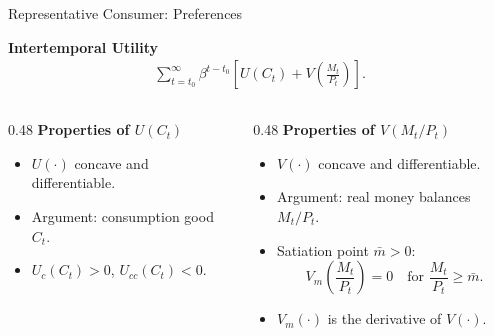 \documentclass[11pt,aspectratio=169]{beamer}
\begin{document}
\begin{frame}{Representative Consumer: Preferences}
\small

\textbf{Intertemporal Utility}
\begin{align}
\sum_{t=t_0}^\infty 
\beta^{t-t_0}
\left[
    U(C_t)
    +
    V\!\left(\frac{M_t}{P_t}\right)
\right].
\label{2.1}
\end{align}

\vspace{0.8em}

\begin{columns}[T,totalwidth=\textwidth]

\begin{column}{0.48\textwidth}
\textbf{Properties of $U(C_t)$}
\begin{itemize}
    \item $U(\cdot)$ concave and differentiable.
    \item Argument: consumption good $C_t$.
    \item $U_c(C_t) > 0$,
          \quad $U_{cc}(C_t) < 0$.
\end{itemize}
\end{column}

\begin{column}{0.48\textwidth}
\textbf{Properties of $V(M_t/P_t)$}
\begin{itemize}
    \item $V(\cdot)$ concave and differentiable.
    \item Argument: real money balances $M_t/P_t$.
    \item Satiation point $\bar{m} > 0$:
    \[
        V_m\!\left(\frac{M_t}{P_t}\right)=0
        \quad \text{for }
        \frac{M_t}{P_t} \ge \bar{m}.
    \]
    \item $V_m(\cdot)$ is the derivative of $V(\cdot)$.
\end{itemize}
\end{column}

\end{columns}

\end{frame}
\end{document}
